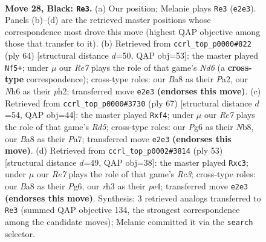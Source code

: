 \documentclass[11pt]{article}
\begin{document}
\clearpage

\begin{figure}[p]\centering
\begin{subfigure}{0.46\textwidth}\centering
\resizebox{\linewidth}{!}{%
\newchessgame
\chessboard[
  setfen={b3k2r/P4p2/6pn/4P3/8/2N2NKR/4r1P1/R7 b k - 2 28},
  showmover=false,
  pgfstyle=straightmove, color=movearrow, markmove={e2-e3}
]}
\caption{}
\end{subfigure}\hfill
\begin{subfigure}{0.46\textwidth}\centering
\resizebox{\linewidth}{!}{%
\newchessgame
\chessboard[
  setfen={7r/p4pk1/3Nr3/2P1n3/8/1R6/PP3P1p/2K4R w - - 10 33},
  showmover=false,
  pgfstyle=straightmove, color=movearrow, markmove={d6-f5}
]}
\caption{}
\end{subfigure}
\\[4pt]
\begin{subfigure}{0.46\textwidth}\centering
\resizebox{\linewidth}{!}{%
\newchessgame
\chessboard[
  setfen={1n4k1/p6p/P7/R4p2/3r1P2/2rp1N1P/6P1/3R1K2 b - - 2 34},
  showmover=false,
  pgfstyle=straightmove, color=movearrow, markmove={d4-f4}
]}
\caption{}
\end{subfigure}\hfill
\begin{subfigure}{0.46\textwidth}\centering
\resizebox{\linewidth}{!}{%
\newchessgame
\chessboard[
  setfen={5rk1/p6p/2r1n1p1/4N3/4P3/2P2P1P/6K1/R2R4 b - - 0 27},
  showmover=false,
  pgfstyle=straightmove, color=movearrow, markmove={c6-c3}
]}
\caption{}
\end{subfigure}
\caption{\textbf{Move 28, Black: \texttt{Re3}.} (a) Our position; Melanie plays \texttt{Re3} (\texttt{e2e3}). Panels (b)--(d) are the retrieved master positions whose correspondence most drove this move (highest QAP objective among those that transfer to it). (b) Retrieved from \texttt{ccrl\_top\_p0000\#822} (ply 64) [structural distance $d$=50, QAP obj=53]: the master played \texttt{Nf5+}; under $\mu$ our \emph{Re7} plays the role of that game's \emph{Nd6} (a \textbf{cross-type} correspondence); cross-type roles: our \emph{B}a8 as their \emph{P}a2, our \emph{N}h6 as their \emph{p}h2; transferred move \texttt{e2e3} \textbf{(endorses this move)}. (c) Retrieved from \texttt{ccrl\_top\_p0000\#3730} (ply 67) [structural distance $d$=54, QAP obj=44]: the master played \texttt{Rxf4}; under $\mu$ our \emph{Re7} plays the role of that game's \emph{Rd5}; cross-type roles: our \emph{P}g6 as their \emph{N}b8, our \emph{B}a8 as their \emph{P}a7; transferred move \texttt{e2e3} \textbf{(endorses this move)}. (d) Retrieved from \texttt{ccrl\_top\_p0002\#3814} (ply 53) [structural distance $d$=49, QAP obj=38]: the master played \texttt{Rxc3}; under $\mu$ our \emph{Re7} plays the role of that game's \emph{Rc3}; cross-type roles: our \emph{B}a8 as their \emph{P}g6, our \emph{r}h3 as their \emph{p}e4; transferred move \texttt{e2e3} \textbf{(endorses this move)}. Synthesis: 3 retrieved analogs transferred to \texttt{Re3} (summed QAP objective 134, the strongest correspondence among the candidate moves); Melanie committed it via the \texttt{search} selector.}
\label{fig:thought-m55}
\end{figure}
\end{document}
